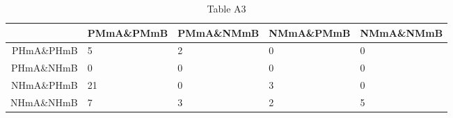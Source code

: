 \begin{table}[ht]
\centering
\begin{tabular}{rllll}
  \hline
 & PMmA\&PMmB & PMmA\&NMmB & NMmA\&PMmB & NMmA\&NMmB \\ 
  \hline
PHmA\&PHmB &  5 &  2 &  0 &  0 \\ 
  PHmA\&NHmB &  0 &  0 &  0 &  0 \\ 
  NHmA\&PHmB & 21 &  0 &  3 &  0 \\ 
  NHmA\&NHmB &  7 &  3 &  2 &  5 \\ 
   \hline
\end{tabular}
\caption{Table A3} 
\end{table}
